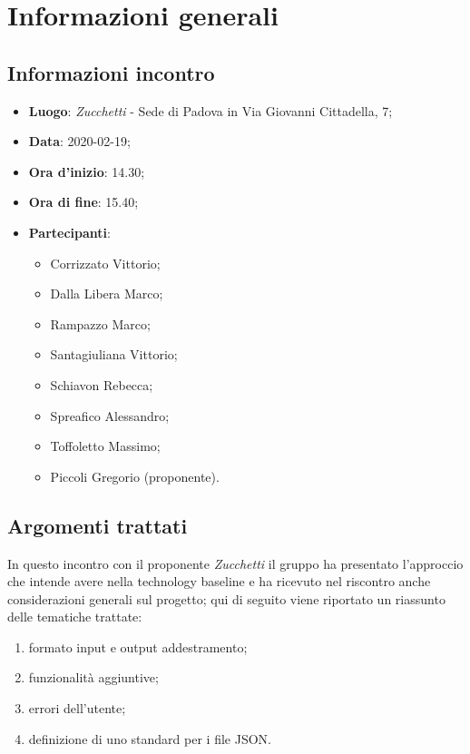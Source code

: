 \section{Informazioni generali}
    \subsection{Informazioni incontro}
        \begin{itemize}
            \item \textbf{Luogo}: \textit{Zucchetti} - Sede di Padova in Via Giovanni Cittadella, 7;
            \item \textbf{Data}: 2020-02-19;
            \item \textbf{Ora d'inizio}: 14.30;
            \item \textbf{Ora di fine}: 15.40;
            \item \textbf{Partecipanti}: 
            \begin{itemize}
                \item Corrizzato Vittorio;
                \item Dalla Libera Marco;
                \item Rampazzo Marco;
                \item Santagiuliana Vittorio;
                \item Schiavon Rebecca;
                \item Spreafico Alessandro;
                \item Toffoletto Massimo;
                \item Piccoli Gregorio (proponente).
            \end{itemize}
        \end{itemize}
    \subsection{Argomenti trattati}
        In questo incontro con il proponente \textit{Zucchetti} il gruppo ha presentato l'approccio che intende avere nella technology baseline e ha ricevuto nel riscontro anche considerazioni generali sul progetto\glo; qui di seguito viene riportato un riassunto delle tematiche trattate:
        \begin{enumerate}
            \item formato input e output addestramento;
            \item funzionalità aggiuntive;
            \item errori dell'utente;
            \item definizione di uno standard per i file JSON.
        \end{enumerate}
